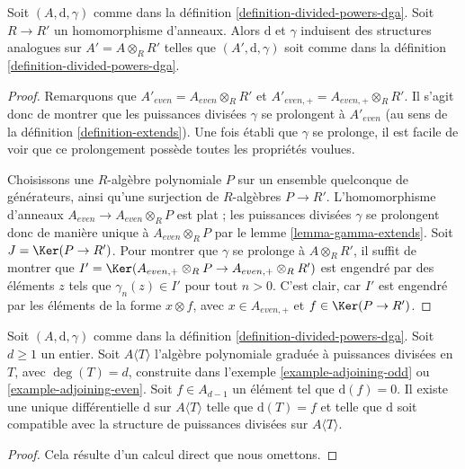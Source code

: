 \begin{lemma}
\label{lemma-base-change-div}
Soit $(A, \text{d}, \gamma)$ comme dans
la définition \ref{definition-divided-powers-dga}.
Soit $R \to R'$ un homomorphisme
d'anneaux. Alors $\text{d}$ et $\gamma$ induisent des structures analogues sur
$A' = A \otimes_R R'$ telles que $(A', \text{d}, \gamma)$ soit comme
dans la définition \ref{definition-divided-powers-dga}.
\end{lemma}

\begin{proof}
Remarquons que $A'_{even} = A_{even} \otimes_R R'$ et
$A'_{even, +} = A_{even, +} \otimes_R R'$. Il s'agit donc de
montrer que les puissances divisées $\gamma$ se prolongent à $A'_{even}$
(au sens de la définition \ref{definition-extends}).
Une fois établi que $\gamma$ se prolonge, il est facile de voir que ce
prolongement possède toutes les propriétés voulues.

\medskip\noindent
Choisissons une $R$-algèbre polynomiale $P$ sur un ensemble quelconque de
générateurs, ainsi qu'une surjection de $R$-algèbres
$P \to R'$. L'homomorphisme d'anneaux $A_{even} \to A_{even} \otimes_R P$ est plat
; les puissances divisées $\gamma$ se prolongent donc de manière unique à $A_{even} \otimes_R P$
par le lemme \ref{lemma-gamma-extends}.
Soit $J = \Ker(P \to R')$. Pour montrer que $\gamma$ se
prolonge à $A \otimes_R R'$, il suffit de montrer que
$I' = \Ker(A_{even, +} \otimes_R P \to A_{even, +} \otimes_R R')$
est engendré par des éléments $z$ tels que $\gamma_n(z) \in I'$
pour tout $n > 0$. C'est clair, car $I'$ est engendré par les
éléments de la forme $x \otimes f$, avec
$x \in A_{even, +}$ et $f \in\Ker(P \to R')$.
\end{proof}

\begin{lemma}
\label{lemma-extend-differential}
Soit $(A, \text{d}, \gamma)$ comme dans
la définition \ref{definition-divided-powers-dga}.
Soit $d \geq 1$ un entier.
Soit $A\langle T \rangle$ l'algèbre polynomiale graduée à puissances divisées
en $T$, avec $\deg(T) = d$,
construite dans l'exemple \ref{example-adjoining-odd} ou
\ref{example-adjoining-even}.
Soit $f \in A_{d - 1}$ un élément tel que $\text{d}(f) = 0$.
Il existe une unique différentielle $\text{d}$
sur $A\langle T\rangle$ telle que $\text{d}(T) = f$ et
telle que $\text{d}$ soit compatible avec la structure de
puissances divisées sur $A\langle T \rangle$.
\end{lemma}

\begin{proof}
Cela résulte d'un calcul direct que nous omettons.
\end{proof}

